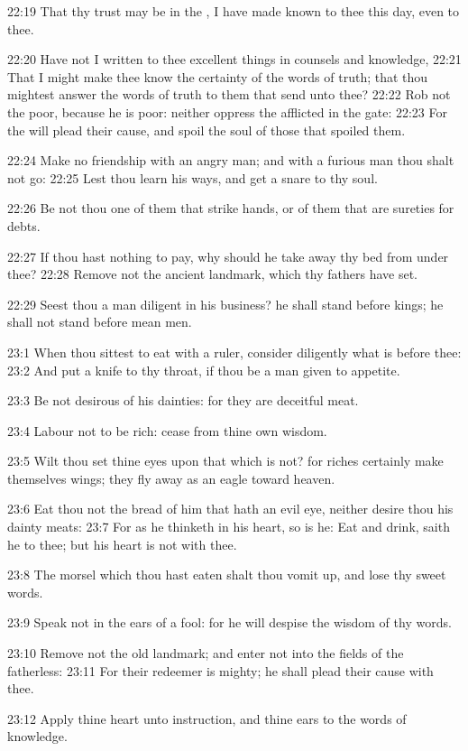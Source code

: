 22:19 That thy trust may be in the \LORD, I have made known to thee
this day, even to thee.

22:20 Have not I written to thee excellent things in counsels and
knowledge, 22:21 That I might make thee know the certainty of the
words of truth; that thou mightest answer the words of truth to them
that send unto thee?  22:22 Rob not the poor, because he is poor:
neither oppress the afflicted in the gate: 22:23 For the \LORD will
plead their cause, and spoil the soul of those that spoiled them.

22:24 Make no friendship with an angry man; and with a furious man
thou shalt not go: 22:25 Lest thou learn his ways, and get a snare to
thy soul.

22:26 Be not thou one of them that strike hands, or of them that are
sureties for debts.

22:27 If thou hast nothing to pay, why should he take away thy bed
from under thee?  22:28 Remove not the ancient landmark, which thy
fathers have set.

22:29 Seest thou a man diligent in his business? he shall stand before
kings; he shall not stand before mean men.

23:1 When thou sittest to eat with a ruler, consider diligently what
is before thee: 23:2 And put a knife to thy throat, if thou be a man
given to appetite.

23:3 Be not desirous of his dainties: for they are deceitful meat.

23:4 Labour not to be rich: cease from thine own wisdom.

23:5 Wilt thou set thine eyes upon that which is not? for riches
certainly make themselves wings; they fly away as an eagle toward
heaven.

23:6 Eat thou not the bread of him that hath an evil eye, neither
desire thou his dainty meats: 23:7 For as he thinketh in his heart, so
is he: Eat and drink, saith he to thee; but his heart is not with
thee.

23:8 The morsel which thou hast eaten shalt thou vomit up, and lose
thy sweet words.

23:9 Speak not in the ears of a fool: for he will despise the wisdom
of thy words.

23:10 Remove not the old landmark; and enter not into the fields of
the fatherless: 23:11 For their redeemer is mighty; he shall plead
their cause with thee.

23:12 Apply thine heart unto instruction, and thine ears to the words
of knowledge.

